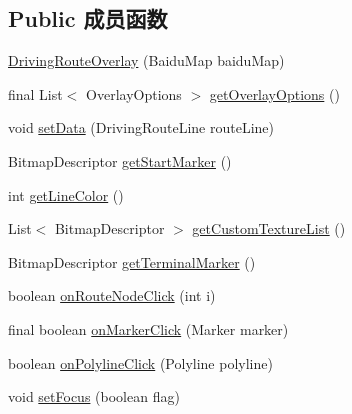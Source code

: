 \subsection*{Public 成员函数}
\begin{DoxyCompactItemize}
\item 
\mbox{\hyperlink{classcom_1_1example_1_1akisame__lin_1_1love__air2_1_1utils_1_1_driving_route_overlay_a796be25922b0cc1290b2e03c329b8d61}{Driving\+Route\+Overlay}} (Baidu\+Map baidu\+Map)
\item 
final List$<$ Overlay\+Options $>$ \mbox{\hyperlink{classcom_1_1example_1_1akisame__lin_1_1love__air2_1_1utils_1_1_driving_route_overlay_a6adeba45057db8c1a17e6b6b236b885c}{get\+Overlay\+Options}} ()
\item 
void \mbox{\hyperlink{classcom_1_1example_1_1akisame__lin_1_1love__air2_1_1utils_1_1_driving_route_overlay_a4b787d4b3f41f3c1d07068ad9ea855bc}{set\+Data}} (Driving\+Route\+Line route\+Line)
\item 
Bitmap\+Descriptor \mbox{\hyperlink{classcom_1_1example_1_1akisame__lin_1_1love__air2_1_1utils_1_1_driving_route_overlay_aa59faddd6f57e162cfa15799dd627d33}{get\+Start\+Marker}} ()
\item 
int \mbox{\hyperlink{classcom_1_1example_1_1akisame__lin_1_1love__air2_1_1utils_1_1_driving_route_overlay_ad3eb34e17af37c0dd6a2af11ec749e61}{get\+Line\+Color}} ()
\item 
List$<$ Bitmap\+Descriptor $>$ \mbox{\hyperlink{classcom_1_1example_1_1akisame__lin_1_1love__air2_1_1utils_1_1_driving_route_overlay_ac0e8b1e242008c4db15ed8dfe214dacc}{get\+Custom\+Texture\+List}} ()
\item 
Bitmap\+Descriptor \mbox{\hyperlink{classcom_1_1example_1_1akisame__lin_1_1love__air2_1_1utils_1_1_driving_route_overlay_ab3f7152173b47f80f29fbff913dabd08}{get\+Terminal\+Marker}} ()
\item 
boolean \mbox{\hyperlink{classcom_1_1example_1_1akisame__lin_1_1love__air2_1_1utils_1_1_driving_route_overlay_af9e5e7a23f569c8d0dc3b3977c247338}{on\+Route\+Node\+Click}} (int i)
\item 
final boolean \mbox{\hyperlink{classcom_1_1example_1_1akisame__lin_1_1love__air2_1_1utils_1_1_driving_route_overlay_a523bdf42206eb9ee83f8cbe34fc0bd14}{on\+Marker\+Click}} (Marker marker)
\item 
boolean \mbox{\hyperlink{classcom_1_1example_1_1akisame__lin_1_1love__air2_1_1utils_1_1_driving_route_overlay_a4dc929e1a0d57abab0aa13e604e3c5a7}{on\+Polyline\+Click}} (Polyline polyline)
\item 
void \mbox{\hyperlink{classcom_1_1example_1_1akisame__lin_1_1love__air2_1_1utils_1_1_driving_route_overlay_ae1ea40bc4fd568ea5f3b2eea634892e9}{set\+Focus}} (boolean flag)
\end{DoxyCompactItemize}
